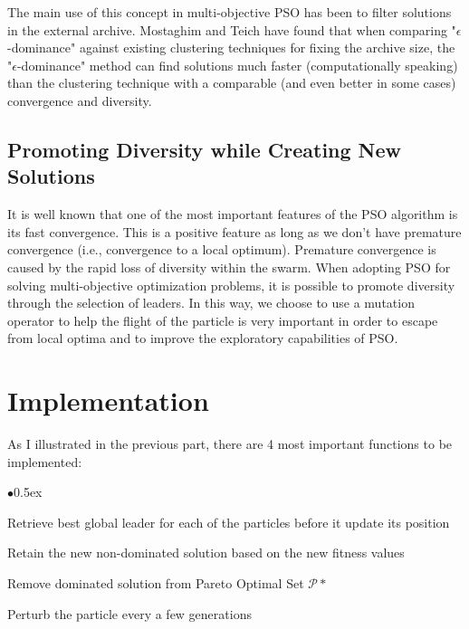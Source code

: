 \documentclass[12pt, runningheads,a4paper]{llncs}
\begin{document}
 The main use of this concept in multi-objective PSO has been to filter solutions in the external archive. Mostaghim and Teich \cite{epsilon2003} have found that when comparing "$\epsilon$-dominance" against existing clustering techniques for fixing the archive size, the "$\epsilon$-dominance" method can find solutions much faster (computationally speaking) than the clustering technique with a comparable (and even better in some cases) convergence and diversity.

\subsection{Promoting Diversity while Creating New Solutions}
It is well known that one of the most important features of the PSO algorithm is its fast convergence. This is a positive feature as long as we don't have premature convergence (i.e., convergence to a local optimum). Premature convergence is caused by the rapid loss of diversity within the swarm. When adopting PSO for solving multi-objective optimization problems, it is possible to promote diversity through the selection of leaders. 
In this way, we choose to use a mutation operator to help the flight of the particle is very important in order to escape from local optima and to improve the exploratory capabilities of PSO. 


\section{Implementation}
\label{Implementation}
As I illustrated in the previous part, there are 4 most important functions to be implemented:

\begin{list}{$\bullet$}{\itemsep 0.5ex}

\item Retrieve best global leader for each of the particles before it update its position
\item Retain the new non-dominated solution based on the new fitness values
\item Remove dominated solution from Pareto Optimal Set $\mathcal{P}*$
\item Perturb the particle every a few generations
\end{list}
\end{document}
